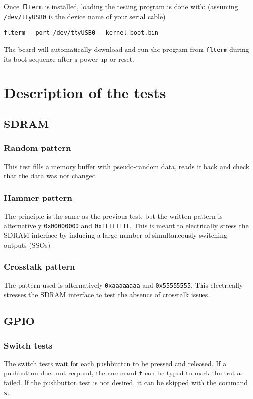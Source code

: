 \documentclass[a4paper,11pt]{article}
\begin{document}
Once \verb!flterm! is installed, loading the testing program is done with: (assuming \verb!/dev/ttyUSB0! is the device name of your serial cable)
\begin{verbatim}
flterm --port /dev/ttyUSB0 --kernel boot.bin
\end{verbatim}

The board will automatically download and run the program from \verb!flterm! during its boot sequence after a power-up or reset.

\section{Description of the tests}
\subsection{SDRAM}
\subsubsection{Random pattern}
This test fills a memory buffer with pseudo-random data, reads it back and check that the data was not changed.

\subsubsection{Hammer pattern}
The principle is the same as the previous test, but the written pattern is alternatively \verb!0x00000000! and \verb!0xffffffff!. This is meant to electrically stress the SDRAM interface by inducing a large number of simultaneously switching outputs (SSOs).

\subsubsection{Crosstalk pattern}
The pattern used is alternatively \verb!0xaaaaaaaa! and \verb!0x55555555!. This electrically stresses the SDRAM interface to test the absence of crosstalk issues.

\subsection{GPIO}
\subsubsection{Switch tests}
The switch tests wait for each pushbutton to be pressed and released. If a pushbutton does not respond, the command \verb!f! can be typed to mark the test as failed. If the pushbutton test is not desired, it can be skipped with the command \verb!s!.
\end{document}
